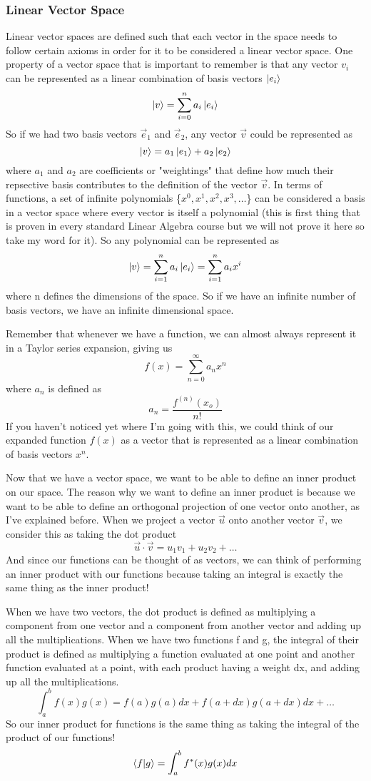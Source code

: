 \documentclass{article}
\newcommand{\be}{\begin{equation}}
\newcommand{\ee}{\end{equation}}
\begin{document}
\subsubsection*{Linear Vector Space}
Linear vector spaces are defined such that each vector in the space needs to follow certain axioms in order for it to be considered a linear vector space.
One property of a vector space that is important to remember is that any vector $v_i$ can be represented as a linear combination of basis vectors $\ket{e_i}$
\be
  \ket{v} = \sum_{i = 0}^{n} a_i \ket{e_i}
\ee
So if we had two basis vectors $\vec{e}_1$ and $\vec{e}_2$, any vector $\vec{v}$ could be represented as
\be
  \ket{v} = a_1 \ket{e_1} + a_2 \ket{e_2}
\ee
where $a_1$ and $a_2$ are coefficients or "weightings" that define how much their repsective basis contributes to the definition of the vector $\vec{v}$.
In terms of functions, a set of infinite polynomials \{$x^0, x^1, x^2, x^3, \hdots$\} can be considered a basis in a vector space where every vector is itself a polynomial (this is first thing that is proven in every standard Linear Algebra course but we will not prove it here so take my word for it).
So any polynomial can be represented as
\be
  \ket{v} = \sum_{i=1}^{n} a_i \ket{e_i} = \sum_{i=1}^{n} a_i x^i
\ee
where n defines the dimensions of the space.
So if we have an infinite number of basis vectors, we have an infinite dimensional space.

Remember that whenever we have a function, we can almost always represent it in a Taylor series expansion, giving us
\be
  f(x) = \sum_{n=0}^{\infty} a_n x^n
\ee
where $a_n$ is defined as
\be
  a_n = \frac{f^{(n)}(x_o)}{n!}
\ee
If you haven't noticed yet where I'm going with this, we could think of our expanded function $f(x)$ as a vector that is represented as a linear combination of basis vectors $x^n$.

Now that we have a vector space, we want to be able to define an inner product on our space.
The reason why we want to define an inner product is because we want to be able to define an orthogonal projection of one vector onto another, as I've explained before.
When we project a vector $\vec{u}$ onto another vector $\vec{v}$, we consider this as taking the dot product
\be
  \vec{u} \cdot \vec{v} = u_1v_1 + u_2v_2 + \hdots
\ee
And since our functions can be thought of as vectors, we can think of performing an inner product with our functions because taking an integral is exactly the same thing as the inner product!

When we have two vectors, the dot product is defined as multiplying a component from one vector and a component from another vector and adding up all the multiplications.
When we have two functions f and g, the integral of their product is defined as multiplying a function evaluated at one point and another function evaluated at a point, with each product having a weight dx, and adding up all the multiplications.
\be
  \int_a^b f(x)g(x) = f(a)g(a)dx + f(a + dx)g(a + dx)dx + \hdots
\ee
So our inner product for functions is the same thing as taking the integral of the product of our functions!
\be
  \braket{f|g} = \int_a^b f^*(x)g(x) dx
\ee
\end{document}
